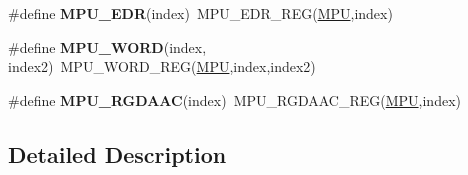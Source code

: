 \begin{DoxyCompactItemize}
\item 
\#define {\bfseries M\+P\+U\+\_\+\+E\+DR}(index)~M\+P\+U\+\_\+\+E\+D\+R\+\_\+\+R\+EG(\hyperlink{group__MPU__Peripheral__Access__Layer_gaad8182e72fe5037a6ba1eb65a1554e0b}{M\+PU},index)\hypertarget{group__MPU__Register__Accessor__Macros_ga433941ad78bc9e637529b8ba991f0b9e}{}\label{group__MPU__Register__Accessor__Macros_ga433941ad78bc9e637529b8ba991f0b9e}

\item 
\#define {\bfseries M\+P\+U\+\_\+\+W\+O\+RD}(index,  index2)~M\+P\+U\+\_\+\+W\+O\+R\+D\+\_\+\+R\+EG(\hyperlink{group__MPU__Peripheral__Access__Layer_gaad8182e72fe5037a6ba1eb65a1554e0b}{M\+PU},index,index2)\hypertarget{group__MPU__Register__Accessor__Macros_ga1a684110cf0cb13beef3a798d88b398e}{}\label{group__MPU__Register__Accessor__Macros_ga1a684110cf0cb13beef3a798d88b398e}

\item 
\#define {\bfseries M\+P\+U\+\_\+\+R\+G\+D\+A\+AC}(index)~M\+P\+U\+\_\+\+R\+G\+D\+A\+A\+C\+\_\+\+R\+EG(\hyperlink{group__MPU__Peripheral__Access__Layer_gaad8182e72fe5037a6ba1eb65a1554e0b}{M\+PU},index)\hypertarget{group__MPU__Register__Accessor__Macros_ga52abc4cdca12582480bbf9c815ec9883}{}\label{group__MPU__Register__Accessor__Macros_ga52abc4cdca12582480bbf9c815ec9883}

\end{DoxyCompactItemize}


\subsection{Detailed Description}
